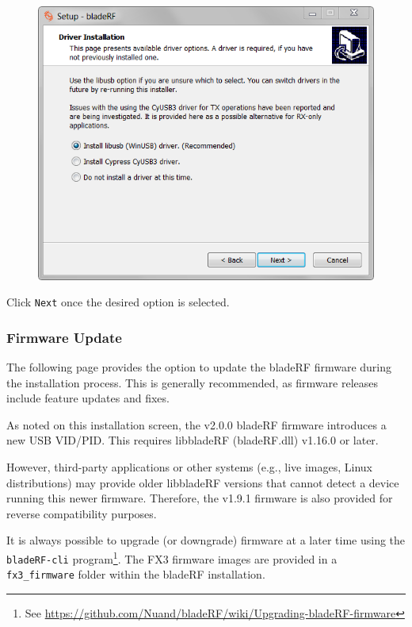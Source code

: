 {\begin{figure}[h]
  \centering
  \includegraphics{images/windows/installer/03-driver.png}
\end{figure}

Click \texttt{Next} once the desired option is selected.

\newpage
\subsubsection{Firmware Update} \label{sec:fwupdate}

The following page provides the option to update the bladeRF firmware during
the installation process. This is generally recommended, as firmware releases
include feature updates and fixes.

As noted on this installation screen, the v2.0.0 bladeRF firmware introduces a new
USB VID/PID. This requires libbladeRF (bladeRF.dll) v1.16.0 or later.

However, third-party applications or other systems (e.g., live images, Linux
distributions) may provide older libbladeRF versions that cannot detect a
device running this newer firmware. Therefore, the v1.9.1 firmware is also
provided for reverse compatibility purposes.

It is always possible to upgrade (or downgrade) firmware at a later time using
the \texttt{bladeRF-cli} program\footnote{See \url{https://github.com/Nuand/bladeRF/wiki/Upgrading-bladeRF-firmware}}.
The FX3 firmware images are provided in a \texttt{fx3\_firmware} folder
within the bladeRF installation.

}
